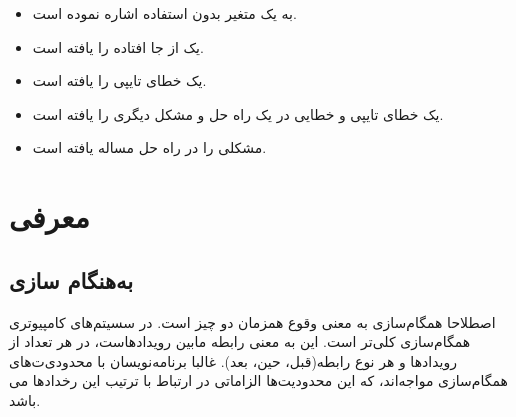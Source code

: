 \documentclass{book}
\newcommand{\clearemptydoublepage}{\newpage\cleardoublepage}
\begin{document}
\begin{itemize}
\item {}
    به یک متغیر بدون استفاده اشاره نموده است. 

\item {}
    یک  از جا افتاده را یافته است. 

\item {} یک خطای تایپی را یافته است. 

\item {}    یک خطای تایپی و خطایی در یک راه حل و مشکل دیگری را یافته است. 

\item {} 
    مشکلی را در راه حل مساله   یافته است. 

\end{itemize}


\tableofcontents
\clearemptydoublepage

\mainmatter


\chapter{معرفی}

\section{به‌هنگام سازی}
\label{synch}

اصطلاحا همگام‌سازی به معنی وقوع همزمان دو چیز است. در سسیتم‌های کامپیوتری همگام‌سازی کلی‌تر است. این به معنی رابطه مابین رویدادهاست، در هر تعداد از رویدادها و هر نوع رابطه(قبل، حین، بعد).
غالبا برنامه‌نویسان با محدودی‌ت‌های همگام‌سازی مواجه‌اند، که این محدودیت‌ها الزاماتی در ارتباط با ترتیب این رخدادها می باشد.
\end{document}
